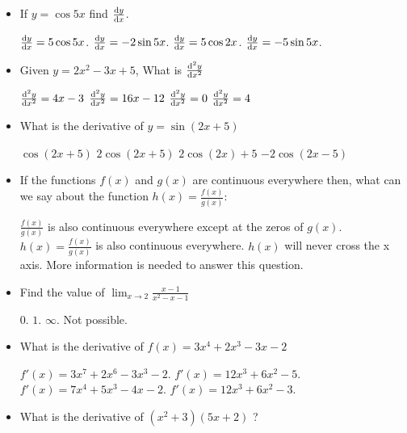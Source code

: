 \documentclass{exam}
\begin{document}
\begin{itemize}
	\item If $y=\cos5x$ find $\dv{y}{x}$.

	\begin{choices}
		\choice $\dv{y}{x} = 5\cos5x$.
		\choice $\dv{y}{x} = -2\sin5x$.
		\choice $\dv{y}{x} = 5\cos2x$.
		\CorrectChoice $\dv{y}{x} = -5\sin5x$.
	\end{choices}
	\item Given $y=2x^2-3x+5$, What is $\dv[2]{y}{x}$

	\begin{choices}
		\choice $\dv[2]{y}{x}=4x-3$
		\choice $\dv[2]{y}{x}=16x-12$
		\choice $\dv[2]{y}{x}=0$
		\CorrectChoice $\dv[2]{y}{x}=4$
	\end{choices}
	\item What is the derivative of $y=\sin (2x + 5)$

	\begin{choices}
		\choice $ \cos(2x+5)$
		\CorrectChoice $ 2\cos(2x+5)$
		\choice $ 2\cos(2x)+5$
		\choice $ -2\cos(2x-5)$
	\end{choices}


	\item If the functions $f(x)$ and $g(x)$ are continuous everywhere then, what can we say about the function $h(x) = \frac{f(x)}{g(x)}$:

	\begin{choices}
		\CorrectChoice $\frac{f(x)}{g(x)}$ is also continuous everywhere except at the zeros of $g(x)$.
		\choice $h(x) = \frac{f(x)}{g(x)}$ is also continuous everywhere.
		\choice $h(x)$ will never cross the x axis.
		\choice More information is needed to answer this question.
	\end{choices}


	\item Find the value of $\lim_{x\to 2}\frac{x-1}{x^2-x-1}$

	\begin{choices}
		\choice $0$.
		\CorrectChoice $1$.
		\choice $\infty$.
		\choice Not possible.
	\end{choices}

	\item What is the derivative of $f(x)= 3x^4+2x^3-3x-2$
	\begin{choices}
		\choice $f'(x)= 3x^7+2x^6-3x^3-2$.
		\choice $f'(x)= 12x^3+6x^2-5$.
		\choice $f'(x)= 7x^4+5x^3-4x-2$.
		\CorrectChoice $f'(x)= 12x^3+6x^2-3$.
	\end{choices}
	\item What is the derivative of $(x^{2} + 3)(5 x + 2)$ ?


\end{itemize}
\end{document}
